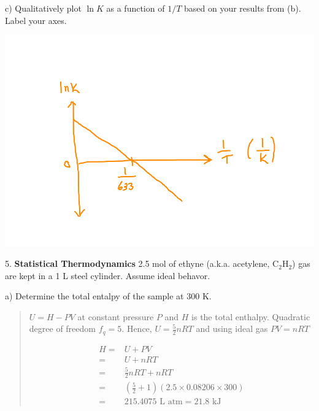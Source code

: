 \documentclass[11pt]{article}
\newcommand{\brian}[1]{
  {\begin{quote}
      \color{blue} #1
  \end{quote}}
}
\begin{document}
c) Qualitatively plot $\ln K$ as a function of $1/T$ based on your results from (b). {\color{blue}
  Label your axes.}

\begin{center}
  \includegraphics[scale=0.4]{vant_hoff.png}
\end{center}

%

5. \textbf{Statistical Thermodynamics} 2.5 mol of ethyne (a.k.a. acetylene, C$_2$H$_2$) gas
are kept in a 1 L steel cylinder. Assume ideal behavor.

a) Determine the total entalpy of the sample at 300 K.

\brian{$U = H - PV$ at constant pressure $P$ and $H$ is the total enthalpy. Quadratic degree
  of freedom $f_q = 5 $. Hence, $U = \frac{5}{2}nRT$ and using ideal gas $PV = nRT$

  \begin{align*}
    H = & U + PV \\
    = & U + nRT \\
    = & \frac{5}{2}nRT + nRT \\
    = & (\frac{5}{2} + 1)(2.5\times 0.08206 \times 300) \\
    = &  \text{215.4075 L atm} = 21.8 \text{ kJ}
  \end{align*}  
}
\end{document}

